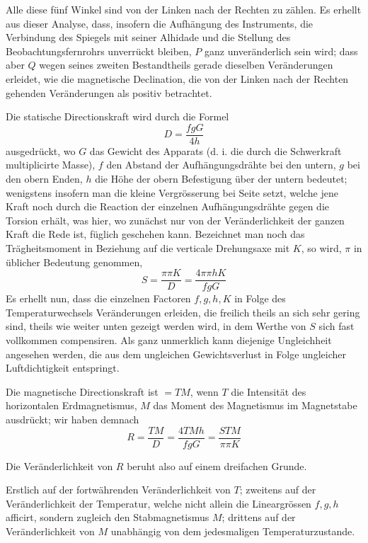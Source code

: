 Alle diese fünf Winkel sind von der Linken nach der Rechten zu zählen. Es erhellt aus dieser Analyse, dass, insofern die Aufhängung des Instruments, die Verbindung des Spiegels mit seiner Alhidade und die Stellung des Beobachtungsfernrohrs unverrückt bleiben, $P$ ganz unveränderlich sein wird; dass aber $Q$ wegen seines zweiten Bestandtheils gerade dieselben Veränderungen erleidet, wie die magnetische Declination, die von der Linken nach der Rechten gehenden Veränderungen als positiv betrachtet.

\par\clearpage
{}
Die statische Directionskraft wird durch die Formel
\[
D=\frac{fgG}{4h}
\]
ausgedrückt, wo $G$ das Gewicht des Apparats (d. i. die durch die Schwerkraft multiplicirte Masse), $f$ den Abstand der Aufhängungsdrähte bei den untern, $g$ bei den obern Enden, $h$ die Höhe der obern Befestigung über der untern bedeutet; wenigstens insofern man die kleine Vergrösserung bei Seite setzt, welche jene Kraft noch durch die Reaction der einzelnen Aufhängungsdrähte gegen die Torsion erhält, was hier, wo zunächst nur von der Veränderlichkeit der ganzen Kraft die Rede ist, füglich geschehen kann. Bezeichnet man noch das Trägheitsmoment in Beziehung auf die verticale Drehungsaxe mit $K$, so wird, $\pi$ in üblicher Bedeutung genommen,
\[
S=\frac{\pi\pi K}{D}=\frac{4\pi\pi hK}{fgG}
\]
Es erhellt nun, dass die einzelnen Factoren $f,g,h,K$ in Folge des Temperaturwechsels Veränderungen erleiden, die freilich theils an sich sehr gering sind, theils wie weiter unten gezeigt werden wird, in dem Werthe von $S$ sich fast vollkommen compensiren. Als ganz unmerklich kann diejenige Ungleichheit angesehen werden, die aus dem ungleichen Gewichtsverlust in Folge ungleicher Luftdichtigkeit entspringt.

Die magnetische Directionskraft ist $=TM$, wenn $T$ die Intensität des horizontalen Erdmagnetismus, $M$ das Moment des Magnetismus im Magnetstabe ausdrückt; wir haben demnach
\[
R=\frac{TM}{D}=\frac{4TMh}{fgG}=\frac{STM}{\pi\pi K}
\]

Die Veränderlichkeit von $R$ beruht also auf einem dreifachen Grunde.

Erstlich auf der fortwährenden Veränderlichkeit von $T$; zweitens auf der Veränderlichkeit der Temperatur, welche nicht allein die Lineargrössen $f,g,h$ afficirt, sondern zugleich den Stabmagnetismus $M$; drittens auf der Veränderlichkeit von $M$ unabhängig von dem jedesmaligen Temperaturzustande.

